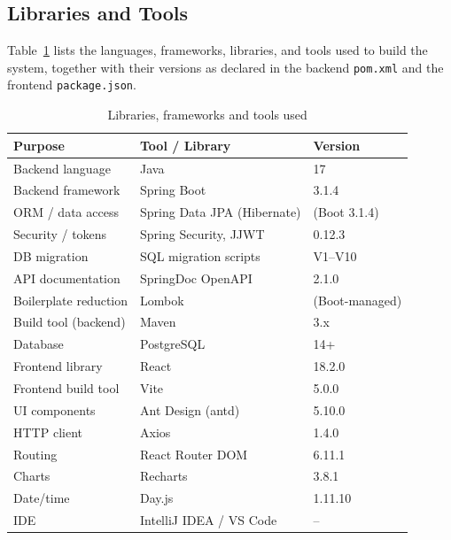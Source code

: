 \subsection{Libraries and Tools}
Table~\ref{tab:tools} lists the languages, frameworks, libraries, and tools used
to build the system, together with their versions as declared in the backend
\texttt{pom.xml} and the frontend \texttt{package.json}.
\begin{table}[H]\centering
\caption{Libraries, frameworks and tools used}
\label{tab:tools}
\begin{tabular}{|l|l|l|}
\hline
\textbf{Purpose} & \textbf{Tool / Library} & \textbf{Version} \\ \hline
Backend language        & Java                    & 17 \\ \hline
Backend framework       & Spring Boot             & 3.1.4 \\ \hline
ORM / data access       & Spring Data JPA (Hibernate) & (Boot 3.1.4) \\ \hline
Security / tokens       & Spring Security, JJWT   & 0.12.3 \\ \hline
DB migration            & SQL migration scripts   & V1--V10 \\ \hline
API documentation       & SpringDoc OpenAPI       & 2.1.0 \\ \hline
Boilerplate reduction   & Lombok                  & (Boot-managed) \\ \hline
Build tool (backend)    & Maven                   & 3.x \\ \hline
Database                & PostgreSQL              & 14+ \\ \hline
Frontend library        & React                   & 18.2.0 \\ \hline
Frontend build tool     & Vite                    & 5.0.0 \\ \hline
UI components           & Ant Design (antd)       & 5.10.0 \\ \hline
HTTP client             & Axios                   & 1.4.0 \\ \hline
Routing                 & React Router DOM        & 6.11.1 \\ \hline
Charts                  & Recharts                & 3.8.1 \\ \hline
Date/time               & Day.js                  & 1.11.10 \\ \hline
IDE                     & IntelliJ IDEA / VS Code & -- \\ \hline
\end{tabular}
\end{table}

